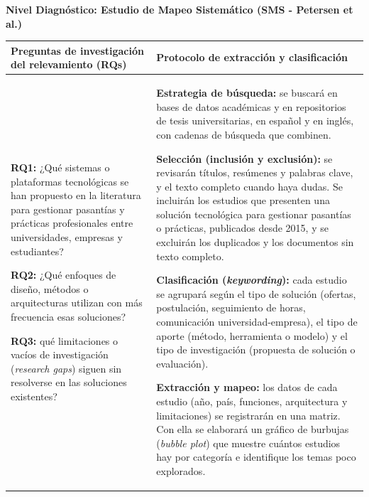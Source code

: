 \documentclass[11pt, a4paper]{article}
\begin{document}
\noindent
\textbf{Nivel Diagnóstico: Estudio de Mapeo Sistemático (SMS - Petersen et al.)}

\vspace{0.3cm}

\noindent
\begin{tabularx}{\textwidth}{|X|X|}
\hline
\rowcolor{gray!15}
\textbf{Preguntas de investigación del relevamiento (RQs)} & \textbf{Protocolo de extracción y clasificación} \\ \hline
\textbf{RQ1:} ¿Qué sistemas o plataformas tecnológicas se han propuesto en la literatura para gestionar pasantías y prácticas profesionales entre universidades, empresas y estudiantes?
\vspace{0.2cm}

\textbf{RQ2:} ¿Qué enfoques de diseño, métodos o arquitecturas utilizan con más frecuencia esas soluciones?
\vspace{0.2cm}

\textbf{RQ3:} qué limitaciones o vacíos de investigación (\textit{research gaps}) siguen sin resolverse en las soluciones existentes? & 
\textbf{Estrategia de búsqueda:} se buscará en bases de datos académicas y en repositorios de tesis universitarias, en español y en inglés, con cadenas de búsqueda que combinen.
\vspace{0.2cm}

\textbf{Selección (inclusión y exclusión):} se revisarán títulos, resúmenes y palabras clave, y el texto completo cuando haya dudas. Se incluirán los estudios que presenten una solución tecnológica para gestionar pasantías o prácticas, publicados desde 2015, y se excluirán los duplicados y los documentos sin texto completo.
\vspace{0.2cm}

\textbf{Clasificación (\textit{keywording}):} cada estudio se agrupará según el tipo de solución (ofertas, postulación, seguimiento de horas, comunicación universidad-empresa), el tipo de aporte (método, herramienta o modelo) y el tipo de investigación (propuesta de solución o evaluación).
\vspace{0.2cm}

\textbf{Extracción y mapeo:} los datos de cada estudio (año, país, funciones, arquitectura y limitaciones) se registrarán en una matriz. Con ella se elaborará un gráfico de burbujas (\textit{bubble plot}) que muestre cuántos estudios hay por categoría e identifique los temas poco explorados. \\ \hline
\end{tabularx}
\end{document}
